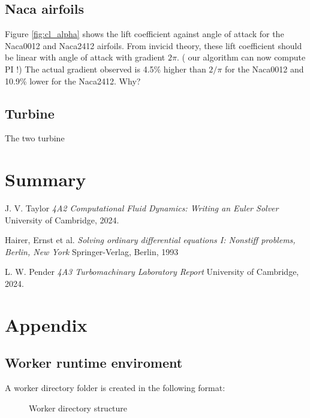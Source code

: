 \documentclass{article}
\begin{document}
\subsection{Naca airfoils}

Figure \ref{fig:cl_alpha} shows the lift coefficient against angle of attack for the Naca0012 and Naca2412 airfoils.
From invicid theory, these lift coefficient should be linear with angle of attack with gradient $ 2\pi $. ( our algorithm can now compute PI !)
The actual gradient observed is 4.5\% higher than $2/\pi$ for the Naca0012 and 10.9\% lower for the Naca2412.
Why?

\subsection{Turbine}

The two turbine 

\section{Summary}

\begin{thebibliography}{9}

    J. V. Taylor
    \emph{4A2 Computational Fluid Dynamics: Writing an Euler Solver}
    University of Cambridge,
    2024.

    Hairer, Ernst et al.
    \emph{Solving ordinary differential equations I: Nonstiff problems, Berlin, New York}
    Springer-Verlag, Berlin, 1993

    L. W. Pender
    \emph{4A3 Turbomachinary Laboratory Report}
    University of Cambridge,
    2024.
  
\end{thebibliography}

\section{Appendix}

\subsection{Worker runtime enviroment}

A worker directory folder is created in the following format:
\begin{figure}[H]
    \caption{Worker directory structure}
    \label{fig:worker_dir}
\end{figure}
\end{document}
